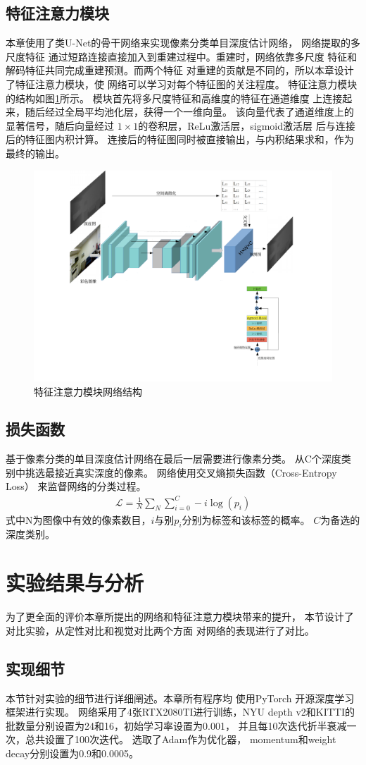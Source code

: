 \subsection{特征注意力模块}
本章使用了类U-Net的骨干网络来实现像素分类单目深度估计网络，
网络提取的多尺度特征
通过短路连接直接加入到重建过程中。重建时，网络依靠多尺度
特征和解码特征共同完成重建预测。而两个特征
对重建的贡献是不同的，所以本章设计了特征注意力模块，使
网络可以学习对每个特征图的关注程度。
特征注意力模块的结构如图\ref{FAM}所示。
模块首先将多尺度特征和高维度的特征在通道维度
上连接起来，随后经过全局平均池化层，获得一个一维向量。
该向量代表了通道维度上的显著信号，随后向量经过
$1\times1$的卷积层，ReLu激活层，sigmoid激活层
后与连接后的特征图内积计算。
连接后的特征图同时被直接输出，与内积结果求和，作为最终的输出。
\begin{figure}[htb]
\centering
\includegraphics[width=0.4\linewidth]{figure/FAM.pdf}
\caption{特征注意力模块网络结构}
\label{FAM}
\end{figure}
\subsection{损失函数}
基于像素分类的单目深度估计网络在最后一层需要进行像素分类。
从C个深度类别中挑选最接近真实深度的像素。
网络使用交叉熵损失函数（Cross-Entropy Loss）
来监督网络的分类过程。
\begin{align}
    \mathcal{L} = \frac{1}{N}\sum_N \sum_{i=0}^{C} -i \log (p_i)
\end{align}
式中N为图像中有效的像素数目，$i$与别$p_i$分别为标签和该标签的概率。
$C$为备选的深度类别。
\section{实验结果与分析}
为了更全面的评价本章所提出的网络和特征注意力模块带来的提升，
本节设计了对比实验，从定性对比和视觉对比两个方面
对网络的表现进行了对比。
\subsection{实现细节}
本节针对实验的细节进行详细阐述。本章所有程序均
使用PyTorch\cite{paszke2019pytorch}
开源深度学习框架进行实现。
网络采用了4张RTX2080TI进行训练，NYU depth v2和KITTI的
批数量分别设置为24和16，初始学习率设置为0.001，
并且每10次迭代折半衰减一次，总共设置了100次迭代。
选取了Adam\cite{2014adam}作为优化器，
momentum和weight decay分别设置为0.9和0.0005。
